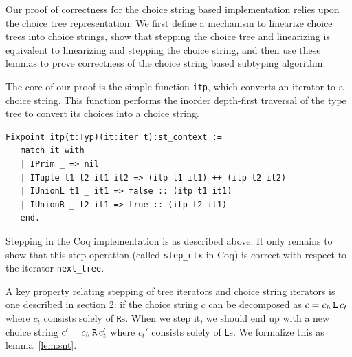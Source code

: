 \documentclass[a4paper,english]{lipics-v2019}
\renewcommand{\L}{{\tt L}\xspace}
\newcommand{\Ls}{{\tt L}s\xspace}
\newcommand{\R}{{\tt R}\xspace}
\newcommand{\Rs}{{\tt R}s\xspace}
\begin{document}
Our proof of correctness for the choice string based implementation relies 
upon the choice tree representation. We first define a mechanism to linearize
choice trees into choice strings, show that stepping the choice tree and linearizing
is equivalent to linearizing and stepping the choice string, and then use these lemmas
to prove correctness of the choice string based subtyping algorithm.

The core of our proof is the simple function \verb|itp|, which converts an iterator
to a choice string. This function performs the inorder depth-first traversal of the
type tree to convert its choices into a choice string. 

\begin{small}\begin{verbatim}
Fixpoint itp(t:Typ)(it:iter t):st_context :=
   match it with
   | IPrim _ => nil
   | ITuple t1 t2 it1 it2 => (itp t1 it1) ++ (itp t2 it2)
   | IUnionL t1 _ it1 => false :: (itp t1 it1)
   | IUnionR _ t2 it1 => true :: (itp t2 it1)
   end.
\end{verbatim}\end{small}

Stepping in the Coq implementation is as described above. It only remains to
show that this step operation (called \verb|step_ctx| in Coq) is correct with
respect to the iterator \verb|next_tree|.

A key property relating stepping of tree iterators and choice
string iterators is one described in section 2: if the choice string $c$  can
be decomposed as $c=c_h\,\L\,c_t$ where $c_t$ consists solely of \Rs. When we
step it, we should end up with a new choice string $c'=c_h\,\R\,c_t'$ where
$c_t'$ consists solely of \Ls. We formalize this as lemma~\ref{lem:snt}.
\end{document}
